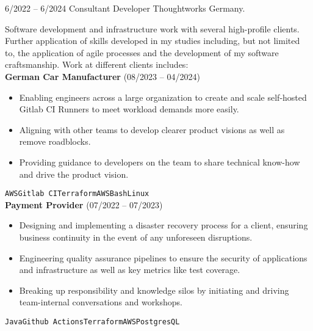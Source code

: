 \documentclass[9pt]{developercv} %
\begin{document}
\begin{entrylist}
	\entry
		{6/2022 -- 6/2024}
		{Consultant Developer}
		{Thoughtworks Germany.}
		{Software development and infrastructure work with several high-profile clients. Further application of skills developed in my studies including, but not limited to, the application of agile processes and the development of my software craftsmanship. Work at different clients includes:\\

        \textbf{German Car Manufacturer} {\footnotesize(08/2023 -- 04/2024)}
        \begin{itemize}
            \item Enabling engineers across a large organization to create and scale self-hosted Gitlab CI Runners to meet workload demands more easily.
            \item Aligning with other teams to develop clearer product visions as well as remove roadblocks.
            \item Providing guidance to developers on the team to share technical know-how and drive the product vision.
        \end{itemize}
  \texttt{AWS}\slashsep\texttt{Gitlab CI}\slashsep\texttt{Terraform}\slashsep\texttt{AWS}\slashsep\texttt{Bash}\slashsep\texttt{Linux}\\
  
        \textbf{Payment Provider} {\footnotesize(07/2022 -- 07/2023)}
        \begin{itemize}
            \item Designing and implementing a disaster recovery process for a client, ensuring business continuity in the event of any unforeseen disruptions.
            \item Engineering quality assurance pipelines to ensure the security of applications and infrastructure as well as key metrics like test coverage.
            \item Breaking up responsibility and knowledge silos by initiating and driving team-internal conversations and workshops.
        \end{itemize}
  \texttt{Java}\slashsep\texttt{Github Actions}\slashsep\texttt{Terraform}\slashsep\texttt{AWS}\slashsep\texttt{PostgresQL}
  
}
\end{entrylist}
\end{document}
